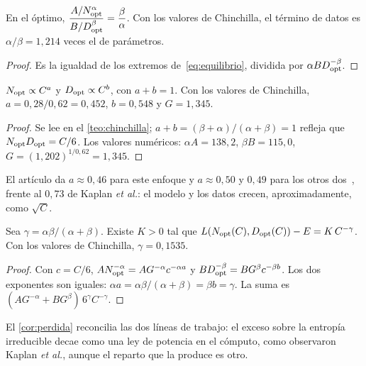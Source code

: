 \begin{corolario}\label{cor:equilibrio}
En el óptimo, $\dfrac{A/N_{\mathrm{opt}}^{\alpha}}{B/D_{\mathrm{opt}}^{\beta}}=\dfrac{\beta}{\alpha}$. Con los valores de Chinchilla, el término de datos es $\alpha/\beta=1{,}214$ veces el de parámetros.
\end{corolario}

\begin{proof}
Es la igualdad de los extremos de~\eqref{eq:equilibrio}, dividida por $\alpha BD_{\mathrm{opt}}^{-\beta}$.
\end{proof}

\begin{corolario}\label{cor:exponentes}
$N_{\mathrm{opt}}\propto C^{a}$ y $D_{\mathrm{opt}}\propto C^{b}$, con $a+b=1$. Con los valores de Chinchilla, $a=0{,}28/0{,}62=0{,}452$, $b=0{,}548$ y $G=1{,}345$.
\end{corolario}

\begin{proof}
Se lee en el \cref{teo:chinchilla}; $a+b=(\beta+\alpha)/(\alpha+\beta)=1$ refleja que $N_{\mathrm{opt}}D_{\mathrm{opt}}=C/6$. Los valores numéricos: $\alpha A=138{,}2$, $\beta B=115{,}0$, $G=(1{,}202)^{1/0{,}62}=1{,}345$.
\end{proof}

El artículo da $a\approx 0{,}46$ para este enfoque y $a\approx 0{,}50$ y $0{,}49$ para los otros dos~\cite[tabla~2]{hoffmann}, frente al $0{,}73$ de Kaplan \emph{et al.}: el modelo y los datos crecen, aproximadamente, como $\sqrt C$.

\begin{corolario}\label{cor:perdida}
Sea $\gamma=\alpha\beta/(\alpha+\beta)$. Existe $K>0$ tal que $L(N_{\mathrm{opt}}(C),D_{\mathrm{opt}}(C))-E=K\,C^{-\gamma}$. Con los valores de Chinchilla, $\gamma=0{,}1535$.
\end{corolario}

\begin{proof}
Con $c=C/6$, $AN_{\mathrm{opt}}^{-\alpha}=AG^{-\alpha}c^{-\alpha a}$ y $BD_{\mathrm{opt}}^{-\beta}=BG^{\beta}c^{-\beta b}$. Los dos exponentes son iguales: $\alpha a=\alpha\beta/(\alpha+\beta)=\beta b=\gamma$. La suma es $(AG^{-\alpha}+BG^{\beta})\,6^{\gamma}C^{-\gamma}$.
\end{proof}

El \cref{cor:perdida} reconcilia las dos líneas de trabajo: el exceso sobre la entropía irreducible decae como una ley de potencia en el cómputo, como observaron Kaplan \emph{et al.}, aunque el reparto que la produce es otro.

